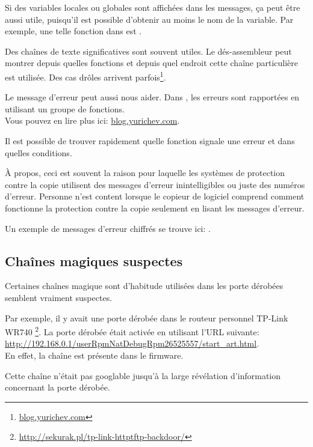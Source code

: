 Si des variables locales ou globales sont affichées dans les messages, ça peut être
aussi utile, puisqu'il est possible d'obtenir au moins le nom de la variable.
Par exemple, une telle fonction dans \oracle est .

Des chaînes de texte significatives sont souvent utiles.
Le dés-assembleur \IDA peut montrer depuis quelles fonctions et depuis quel endroit
cette chaîne particulière est utilisée.
Des cas drôles arrivent parfois\footnote{\href{http://blog.yurichev.com/node/32}{blog.yurichev.com}}.

Le message d'erreur peut aussi nous aider.
Dans \oracle, les erreurs sont rapportées en utilisant un groupe de fonctions.\\
Vous pouvez en lire plus ici: \href{http://blog.yurichev.com/node/43}{blog.yurichev.com}.


Il est possible de trouver rapidement quelle fonction signale une erreur et dans
quelles conditions.

À propos, ceci est souvent la raison pour laquelle les systèmes de protection contre
la copie utilisent des messages d'erreur inintelligibles ou juste des numéros d'erreur.
Personne n'est content lorsque le copieur de logiciel comprend comment fonctionne
la protection contre la copie seulement en lisant les messages d'erreur.

Un exemple de messages d'erreur chiffrés se trouve ici: .

\subsection{Chaînes magiques suspectes}

Certaines chaînes magique sont d'habitude utilisées dans les porte dérobées semblent
vraiment suspectes.

Par exemple, il y avait une porte dérobée dans le routeur personnel TP-Link WR740%
\footnote{\url{http://sekurak.pl/tp-link-httptftp-backdoor/}}.
La porte dérobée était activée en utilisant l'URL suivante:\\
\url{http://192.168.0.1/userRpmNatDebugRpm26525557/start_art.html}.\\

En effet, la chaîne  est présente dans le firmware.

Cette chaîne n'était pas googlable jusqu'à la large révélation d'information concernant
la porte dérobée.

